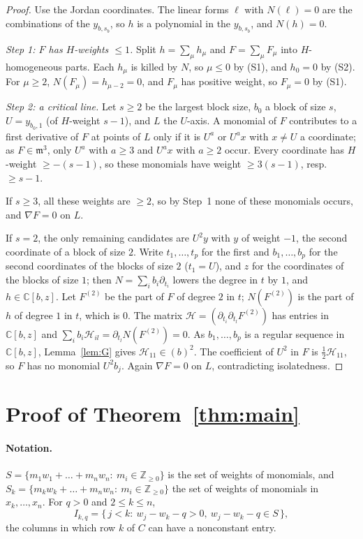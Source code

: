 \documentclass[11pt]{article}
\newcommand{\C}{\mathbb{C}}
\theoremstyle{remark}
\begin{document}
\begin{proof}
Use the Jordan coordinates. The linear forms $\ell$ with $N(\ell)=0$ are the combinations of the $y_{b,s_b}$, so $h$ is a polynomial in the $y_{b,s_b}$, and $N(h)=0$.

\emph{Step 1: $F$ has $H$-weights $\le1$.} Split $h=\sum_\mu h_\mu$ and $F=\sum_\mu F_\mu$ into $H$-homogeneous parts. Each $h_\mu$ is killed by $N$, so $\mu\le0$ by (S1), and $h_0=0$ by (S2). For $\mu\ge2$, $N(F_\mu)=h_{\mu-2}=0$, and $F_\mu$ has positive weight, so $F_\mu=0$ by (S1).

\emph{Step 2: a critical line.} Let $s\ge2$ be the largest block size, $b_0$ a block of size $s$, $U=y_{b_0,1}$ (of $H$-weight $s-1$), and $L$ the $U$-axis. A monomial of $F$ contributes to a first derivative of $F$ at points of $L$ only if it is $U^a$ or $U^ax$ with $x\ne U$ a coordinate; as $F\in\mathfrak m^3$, only $U^a$ with $a\ge3$ and $U^ax$ with $a\ge2$ occur. Every coordinate has $H$-weight $\ge-(s-1)$, so these monomials have weight $\ge3(s-1)$, resp.\ $\ge s-1$.

If $s\ge3$, all these weights are $\ge2$, so by Step~1 none of these monomials occurs, and $\nabla F=0$ on $L$.

If $s=2$, the only remaining candidates are $U^2y$ with $y$ of weight $-1$, the second coordinate of a block of size $2$. Write $t_1,\dots,t_p$ for the first and $b_1,\dots,b_p$ for the second coordinates of the blocks of size $2$ ($t_1=U$), and $z$ for the coordinates of the blocks of size $1$; then $N=\sum_ib_i\partial_{t_i}$ lowers the degree in $t$ by $1$, and $h\in\C[b,z]$. Let $F^{(2)}$ be the part of $F$ of degree $2$ in $t$; $N(F^{(2)})$ is the part of $h$ of degree $1$ in $t$, which is $0$. The matrix $\mathcal H=(\partial_{t_i}\partial_{t_l}F^{(2)})$ has entries in $\C[b,z]$ and $\sum_ib_i\mathcal H_{il}=\partial_{t_l}N(F^{(2)})=0$. As $b_1,\dots,b_p$ is a regular sequence in $\C[b,z]$, Lemma~\ref{lem:G} gives $\mathcal H_{11}\in(b)^2$. The coefficient of $U^2$ in $F$ is $\tfrac12\mathcal H_{11}$, so $F$ has no monomial $U^2b_j$. Again $\nabla F=0$ on $L$, contradicting isolatedness.
\end{proof}

\section{Proof of Theorem~\ref{thm:main}}

\paragraph{Notation.} $S=\{m_1w_1+\dots+m_nw_n:\ m_i\in\mathbb Z_{\ge0}\}$ is the set of weights of monomials, and $S_k=\{m_kw_k+\dots+m_nw_n:\ m_i\in\mathbb Z_{\ge0}\}$ the set of weights of monomials in $x_k,\dots,x_n$. For $q>0$ and $2\le k\le n$,
\[
I_{k,q}=\{\,j<k:\ w_j-w_k-q>0,\ w_j-w_k-q\in S\,\},
\]
the columns in which row $k$ of $C$ can have a nonconstant entry.
\end{document}
